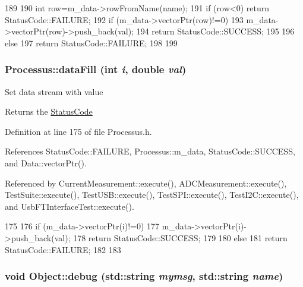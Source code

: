 \begin{DoxyCode}
189                                                  {
190     int row=m_data->rowFromName(name);
191     if (row<0) return StatusCode::FAILURE;
192     if (m_data->vectorPtr(row)!=0){
193       m_data->vectorPtr(row)->push_back(val);
194       return StatusCode::SUCCESS;
195     }
196     else {
197       return StatusCode::FAILURE;
198     }
199   }
\end{DoxyCode}
\hypertarget{classProcessus_a0d093b48f3218a088ba030e24372f18c}{
\subsubsection[{dataFill}]{ Processus::dataFill (int {\em i}, \/  double {\em val})}}
\label{classProcessus_a0d093b48f3218a088ba030e24372f18c}
Set data stream with value \begin{DoxyReturn}{Returns}
the \hyperlink{classStatusCode}{StatusCode} 
\end{DoxyReturn}


Definition at line 175 of file Processus.h.

References StatusCode::FAILURE, Processus::m\_\-data, StatusCode::SUCCESS, and Data::vectorPtr().

Referenced by CurrentMeasurement::execute(), ADCMeasurement::execute(), TestSuite::execute(), TestUSB::execute(), TestSPI::execute(), TestI2C::execute(), and UsbFTInterfaceTest::execute().


\begin{DoxyCode}
175                                         {
176     if (m_data->vectorPtr(i)!=0){
177       m_data->vectorPtr(i)->push_back(val);
178       return StatusCode::SUCCESS;
179     }
180     else {
181       return StatusCode::FAILURE;
182     }
183   }
\end{DoxyCode}
\hypertarget{classObject_a6c9a0397ca804e04d675ed05683f5420}{
\subsubsection[{debug}]{\setlength{\rightskip}{0pt plus 5cm}void Object::debug (std::string {\em mymsg}, \/  std::string {\em name})}}
\label{classObject_a6c9a0397ca804e04d675ed05683f5420}


